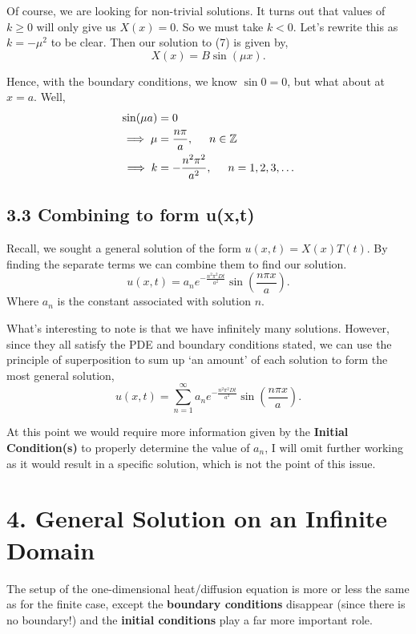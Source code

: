 \documentclass[11pt]{article}
\begin{document}
Of course, we are looking for non-trivial solutions. It turns out that values of $k\geq 0$ will only give us $X(x) = 0$. So we must take $k<0$. Let's rewrite this as $k = -\mu^2$ to be clear. Then our solution to (7) is given by,
\begin{equation}
    X(x) = B \sin (\mu x).
\end{equation}

Hence, with the boundary conditions, we know $\sin 0 = 0$, but what about at $x=a$. Well,
\begin{align}
    \sin (\mu a) &= 0 \\ 
    \implies \mu &= \frac{n \pi}{a}, \hspace{0.5cm} n \in \mathbb{Z} \\
    \implies k &= -\frac{n^2 \pi^2}{a^2}, \hspace{0.5cm} n = 1,2,3, \ldots
\end{align}

\newpage

\subsection*{3.3 Combining to form u(x,t)}

Recall, we sought a general solution of the form $u(x,t) = X(x)T(t)$. By finding the separate terms we can combine them to find our solution.
\begin{equation}
    u(x,t) = a_n e^{-\frac{n^2 \pi^2 Dt}{a^2}} \sin \left( \frac{n \pi x}{a} \right).
\end{equation}
Where $a_n$ is the constant associated with solution $n$.

What's interesting to note is that we have infinitely many solutions. However, since they all satisfy the PDE and boundary conditions stated, we can use the principle of superposition to sum up `an amount' of each solution to form the most general solution,
\begin{equation}
    u(x,t) = \sum_{n=1}^{\infty} a_n e^{-\frac{n^2 \pi^2 Dt}{a^2}} \sin \left( \frac{n \pi x}{a} \right).
\end{equation}

At this point we would require more information given by the \textbf{Initial Condition(s)} to properly determine the value of $a_n$, I will omit further working as it would result in a specific solution, which is not the point of this issue.

\section*{4. General Solution on an Infinite Domain}
The setup of the one-dimensional heat/diffusion equation is more or less the same as for the finite case, except the \textbf{boundary conditions} disappear (since there is no boundary!) and the \textbf{initial conditions} play a far more important role. 
\end{document}
